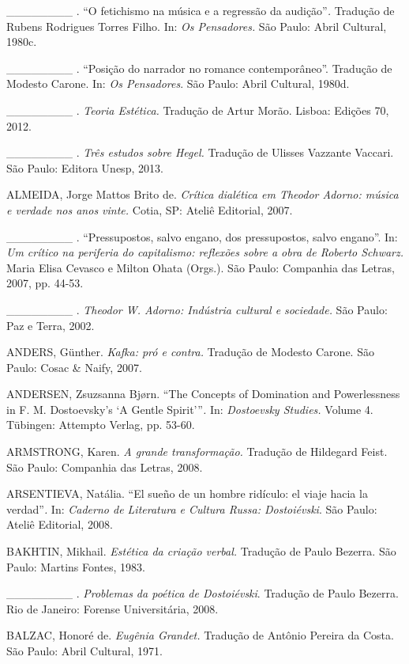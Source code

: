 \_\_\_\_\_\_\_\_ . ``O fetichismo na música e a regressão da
audição''\emph{.} Tradução de Rubens Rodrigues Torres Filho. In:
\emph{Os Pensadores.} São Paulo: Abril Cultural, 1980c.

\_\_\_\_\_\_\_\_ . ``Posição do narrador no romance contemporâneo''.
Tradução de Modesto Carone. In: \emph{Os Pensadores}. São Paulo: Abril
Cultural, 1980d.

\_\_\_\_\_\_\_\_ . \emph{Teoria Estética.} Tradução de Artur Morão.
Lisboa: Edições 70, 2012.

\_\_\_\_\_\_\_\_ . \emph{Três estudos sobre Hegel.} Tradução de Ulisses
Vazzante Vaccari. São Paulo: Editora Unesp, 2013.

ALMEIDA, Jorge Mattos Brito de. \emph{Crítica dialética em Theodor
Adorno: música e verdade nos anos vinte.} Cotia, SP: Ateliê Editorial,
2007.

\_\_\_\_\_\_\_\_ . ``Pressupostos, salvo engano, dos pressupostos, salvo
engano''. In: \emph{Um crítico na periferia do capitalismo: reflexões
sobre a obra de Roberto Schwarz.} Maria Elisa Cevasco e Milton Ohata
(Orgs.). São Paulo: Companhia das Letras, 2007, pp. 44-53.

\_\_\_\_\_\_\_\_ . \emph{Theodor W. Adorno: Indústria cultural e
sociedade.} São Paulo: Paz e Terra, 2002.

ANDERS, Günther. \emph{Kafka: pró e contra.} Tradução de Modesto Carone.
São Paulo: Cosac \& Naify, 2007.

ANDERSEN, Zsuzsanna Bjørn. ``The Concepts of Domination and
Powerlessness in F. M. Dostoevsky's `A Gentle Spirit'''\emph{.} In:
\emph{Dostoevsky Studies.} Volume 4. Tübingen: Attempto Verlag, pp.
53-60.

ARMSTRONG, Karen. \emph{A grande transformação.} Tradução de Hildegard
Feist. São Paulo: Companhia das Letras, 2008.

ARSENTIEVA, Natália. ``El sueño de un hombre ridículo: el viaje hacia la
verdad''\emph{.} In: \emph{Caderno de Literatura e Cultura Russa:
Dostoiévski}. São Paulo: Ateliê Editorial, 2008.

BAKHTIN, Mikhail. \emph{Estética da criação verbal.} Tradução de Paulo
Bezerra. São Paulo: Martins Fontes, 1983.

\_\_\_\_\_\_\_\_ . \emph{Problemas da poética de Dostoiévski}. Tradução
de Paulo Bezerra. Rio de Janeiro: Forense Universitária, 2008.

BALZAC, Honoré de. \emph{Eugênia Grandet.} Tradução de Antônio Pereira
da Costa. São Paulo: Abril Cultural, 1971.

